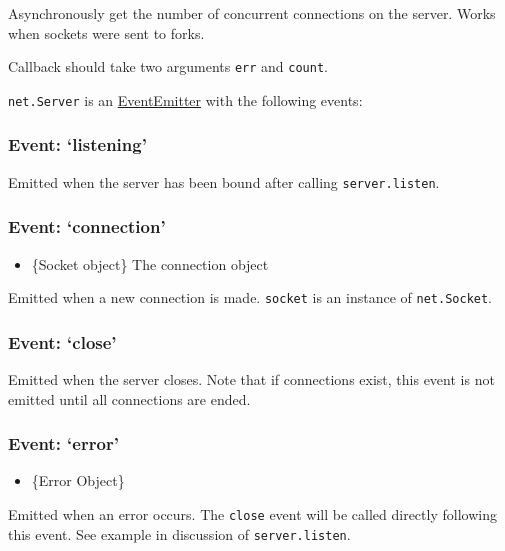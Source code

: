 Asynchronously get the number of concurrent connections on the server.
Works when sockets were sent to forks.

Callback should take two arguments \texttt{err} and \texttt{count}.

\texttt{net.Server} is an
\href{events.html\#events_class_events_eventemitter}{EventEmitter} with
the following events:

\subsubsection{\texorpdfstring{Event:
`listening'}{Event: listening}}\label{event-listening}

Emitted when the server has been bound after calling
\texttt{server.listen}.

\subsubsection{\texorpdfstring{Event:
`connection'}{Event: connection}}\label{event-connection}

\begin{itemize}
\itemsep1pt\parskip0pt
\item
  \{Socket object\} The connection object
\end{itemize}

Emitted when a new connection is made. \texttt{socket} is an instance of
\texttt{net.Socket}.

\subsubsection{\texorpdfstring{Event:
`close'}{Event: close}}\label{event-close}

Emitted when the server closes. Note that if connections exist, this
event is not emitted until all connections are ended.

\subsubsection{\texorpdfstring{Event:
`error'}{Event: error}}\label{event-error}

\begin{itemize}
\itemsep1pt\parskip0pt
\item
  \{Error Object\}
\end{itemize}

Emitted when an error occurs. The
\texttt{\textquotesingle{}close\textquotesingle{}} event will be called
directly following this event. See example in discussion of
\texttt{server.listen}.

